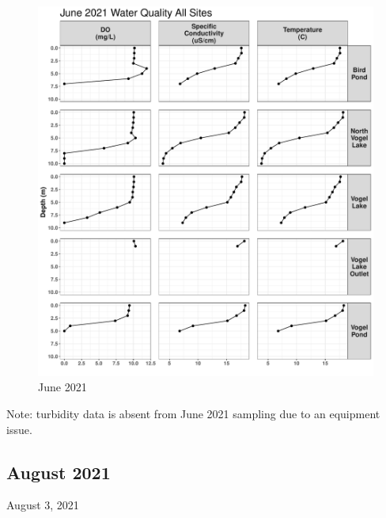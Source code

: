 \documentclass[
]{book}
\begin{document}
\begin{figure}
\centering
\includegraphics{Miller_Creek_Vogel_Lake_Water_Quality_files/figure-latex/unnamed-chunk-7-1.pdf}
\caption{\label{fig:unnamed-chunk-7}June 2021}
\end{figure}

Note: turbidity data is absent from June 2021 sampling due to an equipment issue.

\hypertarget{august-2021}{%
\subsection{August 2021}\label{august-2021}}

August 3, 2021
\end{document}
